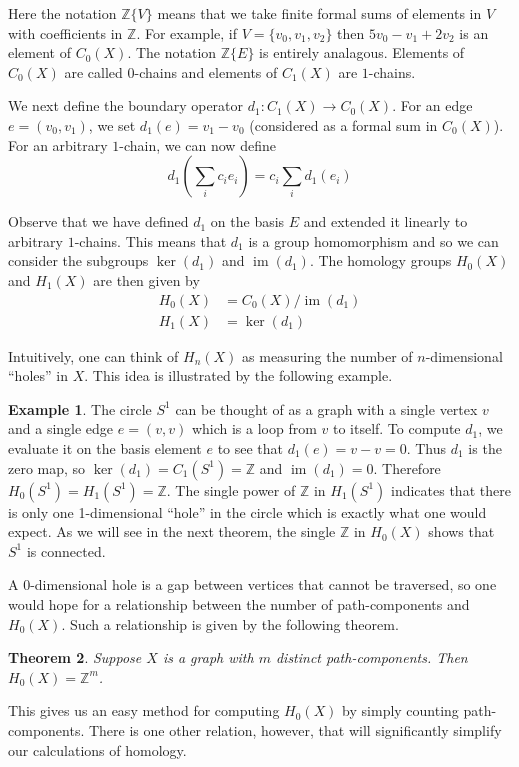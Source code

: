 \documentclass[12pt,a4paper]{amsart}
\numberwithin{equation}{section}
\def\Z{{\mathbb Z}}
\def\im{\operatorname{im}}
\def\ker{\operatorname{ker}}
\theoremstyle{plain}
\newtheorem{Th}{Theorem}[section]
\theoremstyle{definition}
\newtheorem{Ex}[Th]{Example}
\begin{document}
Here the notation $\Z\{V\}$ means that we take finite formal sums of elements in $V$ with coefficients in $\Z$. For example, if $V=\{v_0, v_1, v_2\}$ then $5v_0 - v_1 + 2v_2$ is an element of $C_0(X)$. The notation $\Z\{E\}$ is entirely analagous. Elements of $C_0(X)$ are called $0$-chains and elements of $C_1(X)$ are $1$-chains.

We next define the boundary operator $d_1 : C_1(X) \to C_0(X)$. For an edge $e=(v_0,v_1)$, we set $d_1(e) = v_1-v_0$ (considered as a formal sum in $C_0(X)$). For an arbitrary $1$-chain, we can now define
\[ d_1\left( \sum_i c_i e_i \right) = c_i \sum_i d_1(e_i) \]

Observe that we have defined $d_1$ on the basis $E$ and extended it linearly to arbitrary $1$-chains. This means that $d_1$ is a group homomorphism and so we can consider the subgroups $\ker(d_1)$ and $\im(d_1)$. The homology groups $H_0(X)$ and $H_1(X)$ are then given by
\begin{align*}
H_0(X) &= C_0(X) / \im(d_1) \\
H_1(X) &= \ker(d_1)
\end{align*}

Intuitively, one can think of $H_n(X)$ as measuring the number of $n$-dimensional ``holes'' in $X$. This idea is illustrated by the following example.

\begin{Ex} 
The circle $S^1$ can be thought of as a graph with a single vertex $v$ and a single edge $e = (v,v)$ which is a loop from $v$ to itself. To compute $d_1$, we evaluate it on the basis element $e$ to see that $d_1(e) = v-v = 0$. Thus $d_1$ is the zero map, so $\ker(d_1) = C_1(S^1) = \Z$ and $\im(d_1) = 0$. Therefore $H_0(S^1) = H_1(S^1) = \Z$. The single power of $\Z$ in $H_1(S^1)$ indicates that there is only one 1-dimensional ``hole'' in the circle which is exactly what one would expect. As we will see in the next theorem, the single $\Z$ in $H_0(X)$ shows that $S^1$ is connected.
\end{Ex}

A 0-dimensional hole is a gap between vertices that cannot be traversed, so one would hope for a relationship between the number of path-components and $H_0(X)$. Such a relationship is given by the following theorem.

\begin{Th}
Suppose $X$ is a graph with $m$ distinct path-components. Then $H_0(X) = \Z^m$.
\end{Th}

This gives us an easy method for computing $H_0(X)$ by simply counting path-components. There is one other relation, however, that will significantly simplify our calculations of homology.
\end{document}
